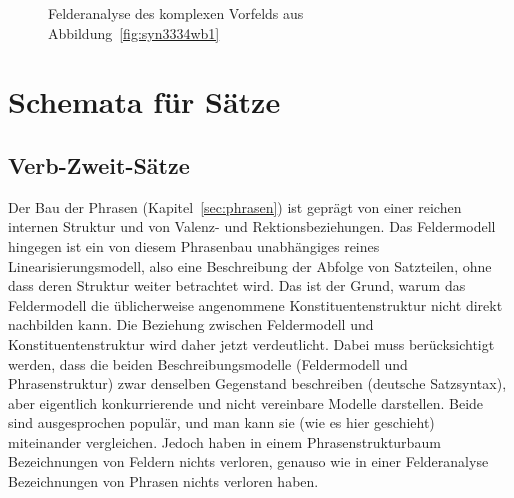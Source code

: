 \begin{figure}[!htbp]
  \centering
  \caption{Felderanalyse des komplexen Vorfelds aus Abbildung~\ref{fig:syn3334wb1}}
  \label{fig:syn3334wb2}
\end{figure}



 
\section{Schemata für Sätze}

\label{sec:satzschemata}
\label{sec:verbzweitsatz}

\subsection{Verb-Zweit-Sätze}

\label{sec:konstituentenstrukturinv2}

Der Bau der Phrasen (Kapitel~\ref{sec:phrasen}) ist geprägt von einer reichen internen Struktur und von Valenz- und Rektionsbeziehungen.
Das Feldermodell hingegen ist ein von diesem Phrasenbau unabhängiges reines Linearisierungsmodell, also eine Beschreibung der Abfolge von Satzteilen, ohne dass deren Struktur weiter betrachtet wird.
Das ist der Grund, warum das Feldermodell die üblicherweise angenommene Konstituentenstruktur nicht direkt nachbilden kann.
Die Beziehung zwischen Feldermodell und Konstituentenstruktur wird daher jetzt verdeutlicht.
Dabei muss berücksichtigt werden, dass die beiden Beschreibungsmodelle (Feldermodell und Phrasenstruktur) zwar denselben Gegenstand beschreiben (deutsche Satzsyntax), aber eigentlich konkurrierende und nicht vereinbare Modelle darstellen.
Beide sind ausgesprochen populär, und man kann sie (wie es hier geschieht) miteinander vergleichen.
Jedoch haben in einem Phrasenstrukturbaum Bezeichnungen von Feldern nichts verloren, genauso wie in einer Felderanalyse Bezeichnungen von Phrasen nichts verloren haben.

